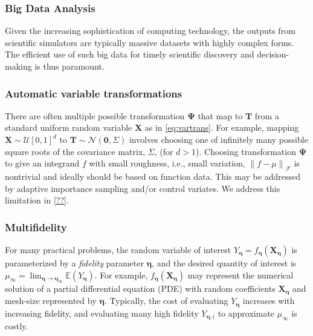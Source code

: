 \documentclass[11pt]{NSFamsart}
\newcommand{\fidparam}{\bldeta}
\newcommand{\bbE}{\mathbb{E}}
\newcommand{\mSigma}{\mathsf{\Sigma}}
\newcommand{\bzero}{\boldsymbol{0}}
\newcommand{\bT}{{\boldsymbol{T}}}
\newcommand{\bX}{{\boldsymbol{X}}}
\newcommand{\bPsi}{{\boldsymbol{\Psi}}}
\newcommand{\bldeta}{{\boldsymbol{\eta}}}
\newcommand{\calf}{{\mathcal{F}}}
\newcommand{\caln}{{\mathcal{N}}}
\newcommand{\calu}{{\mathcal{U}}}
\newcommand{\norm}[2][{}]{\ensuremath{\left \lVert #2 \right \rVert}_{#1}}
\begin{document}
\subsubsection{Big Data Analysis} Given the increasing sophistication of computing technology, the outputs from scientific simulators are typically massive datasets with highly complex forms. The efficient use of such big data for timely scientific discovery and decision-making is thus paramount. 

\subsubsection{Automatic variable transformations}  There are often multiple possible transformation $\bPsi$ that map to $\bT$ from a standard uniform random variable $\bX$ as in \eqref{eq:vartrans}.  For example, mapping $\bX \sim \calu[0,1]^d$ to $\bT \sim \caln(\bzero,\mSigma)$  involves choosing one of infinitely many possible square roots of the covariance matrix, $\mSigma$, (for $d>1$).  Choosing transformation $\bPsi$ to give an integrand $f$ with small roughness, i.e., small variation, $\norm[\calf]{f - \mu}$ is nontrivial and ideally should be based on function data. This may be addressed by adaptive importance sampling and/or  control variates. We address this limitation in \cref{??}.

\subsubsection{Multifidelity} For many practical problems, the random variable of interest $Y_\fidparam = f_\fidparam(\bX_\fidparam)$ is parameterized by a \emph{fidelity} parameter $\fidparam$, and the desired quantity of interest is $\mu_\infty = \lim_{\fidparam \to \fidparam_\infty} \bbE(Y_\fidparam)$.  For example, $f_\fidparam(\bX_\fidparam)$ may represent the numerical solution of  a partial differential equation (PDE) with random coefficients $\bX_\fidparam$ and mesh-size represented by $\fidparam$.  Typically, the cost of evaluating $Y_\fidparam$ increases with increasing fidelity, and evaluating many high fidelity $Y_{\fidparam,i}$ to approximate $\mu_\infty$ is costly.
\end{document}
